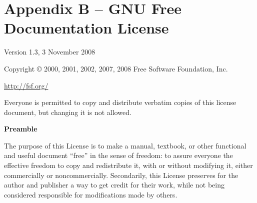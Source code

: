\chapter{Appendix B -- GNU Free Documentation License} \label{Appendix B}
\ifdefined\chs

\fi

\ifdefined\eng
{}  %
\fi

\ifdefined\chs

\fi

\ifdefined\eng
 \begin{center}
\fi

\ifdefined\chs

\fi

\ifdefined\eng
       Version 1.3, 3 November 2008
\fi

\ifdefined\chs

\fi

\ifdefined\eng
\fi

\ifdefined\chs

\fi

\ifdefined\eng
 Copyright \copyright{} 2000, 2001, 2002, 2007, 2008  Free Software Foundation, Inc.
 
 \bigskip
 
     \url{http://fsf.org/}
  
 \bigskip
 
 Everyone is permitted to copy and distribute verbatim copies
 of this license document, but changing it is not allowed.
\end{center}
\fi

\ifdefined\chs

\fi

\ifdefined\eng
\fi

\ifdefined\chs

\fi

\ifdefined\eng
\begin{center}
{\bf\large Preamble}
\end{center}
\fi

\ifdefined\chs

\fi

\ifdefined\eng
The purpose of this License is to make a manual, textbook, or other
functional and useful document ``free'' in the sense of freedom: to
assure everyone the effective freedom to copy and redistribute it,
with or without modifying it, either commercially or noncommercially.
Secondarily, this License preserves for the author and publisher a way
to get credit for their work, while not being considered responsible
for modifications made by others.
\fi

